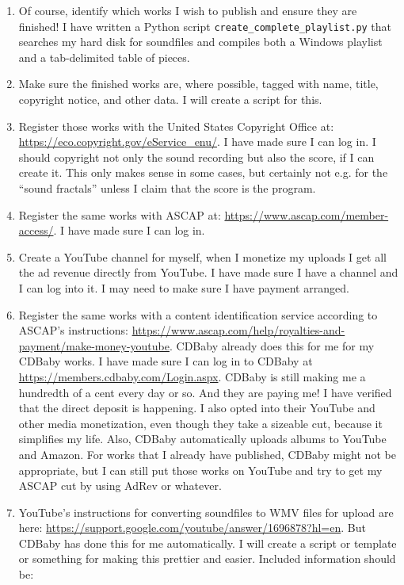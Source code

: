 \documentclass[english,11pt,letterpaper,onecolumn]{scrartcl}
\begin{document}
\begin{enumerate}
\item Of course, identify which works I wish to publish and ensure they are finished! I have written a Python script \texttt{create\_complete\_playlist.py} that searches my hard disk for soundfiles and compiles both a Windows playlist and a tab-delimited table of pieces.
\item Make sure the finished works are, where possible, tagged with name, title, copyright notice, and other data. I will create a script for this.
\item Register those works with the United States Copyright Office at: \url{https://eco.copyright.gov/eService_enu/}. I have made sure I can log in. I should copyright not only the sound recording but also the score, if I can create it. This only makes sense in some cases, but certainly not e.g. for the ``sound fractals'' unless I claim that the score is the program.
\item Register the same works with ASCAP at: \url{https://www.ascap.com/member-access/}. I have made sure I can log in.
\item Create a YouTube channel for myself, when I monetize my uploads I get all the ad revenue directly from YouTube. I have made sure I have a channel and I can log into it. I may need to make sure I have payment arranged.
\item Register the same works with a content identification service according to ASCAP's instructions: \url{https://www.ascap.com/help/royalties-and-payment/make-money-youtube}. CDBaby already does this for me for my CDBaby works. I have made sure I can log in to CDBaby at \url{https://members.cdbaby.com/Login.aspx}. CDBaby is still making me a hundredth of a cent every day or so. And they are paying me! I have verified that the direct deposit is happening. I also opted into their YouTube and other media monetization, even though they take a sizeable cut, because it simplifies my life. Also, CDBaby automatically uploads albums to YouTube and Amazon.
\noindent For works that I already have published, CDBaby might not be appropriate, but I can still put those works on YouTube and try to get my ASCAP cut by using AdRev or whatever.
\item YouTube's instructions for converting soundfiles to WMV files for upload are here: \url{https://support.google.com/youtube/answer/1696878?hl=en}. But CDBaby has done this for me automatically. I will create a script or template or something for making this prettier and easier. Included information should be:

\end{enumerate}
\end{document}

